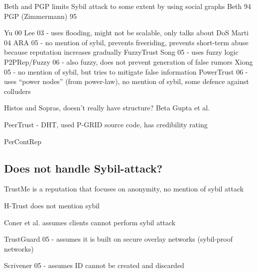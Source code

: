 Beth and PGP limits Sybil attack to some extent by using social graphs
Beth 94\cite{beth1994valuation}
PGP (Zimmermann) 95\cite{zimmermann1995official}

Yu 00\cite{yu2000social}
Lee 03\cite{lee2003cooperative} - uses flooding, might not be scalable, only talks about DoS
Marti 04\cite{marti2004limited}
ARA 05\cite{ham2005ara} - no mention of sybil, prevents freeriding, prevents short-term abuse because reputation increases gradually
FuzzyTrust Song 05\cite{song2005trusted} - uses fuzzy logic
P2PRep/Fuzzy 06\cite{aringhieri2006fuzzy} - also fuzzy, does not prevent generation of false rumors
Xiong 05\cite{xiong2007countering} - no mention of sybil, but tries to mitigate false information
PowerTrust 06\cite{zhou2007powertrust} - uses ``power nodes'' (from power-law), no mention of sybil, some defence against colluders

Histos and Sopras\cite{zacharia2000collaborative}, doesn't really have structure?
Beta\cite{jsang2002beta}
Gupta et al.\cite{gupta2003reputation}

PeerTrust\cite{xiong2004peertrust} - DHT, used P-GRID source code, has credibility rating

PerContRep\cite{yan2014percontrep}


\subsection{Does not handle Sybil-attack?}
TrustMe\cite{singh2003trustme} is a reputation that focuses on anonymity, no mention of sybil attack

H-Trust\cite{zhao2009htrust} does not mention sybil

Coner et al.\cite{conner2009trust} assumes clients cannot perform sybil attack

TrustGuard 05\cite{srivatsa2005trustguard} - assumes it is built on secure overlay networks (sybil-proof networks)

Scrivener 05\cite{nandi2005scrivener} - assumes ID cannot be created and discarded

